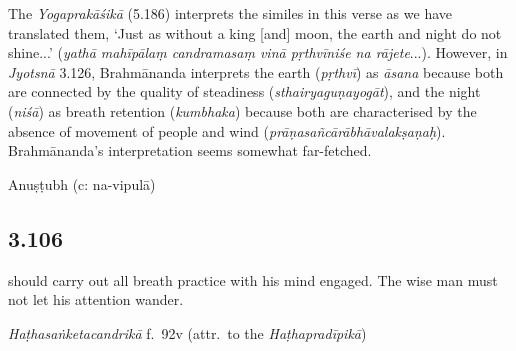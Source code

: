 \begin{ekdosis}
\begin{testimonia}[hp03_105]
\end{testimonia}

\begin{philcomm}[hp03_105]
The \emph{Yogaprakāśikā} (5.186) interprets the similes in this verse as we have translated them, `Just as without a king [and] moon, the earth and night do not shine...' (\emph{yathā mahīpālaṃ candramasaṃ vinā pṛthvīniśe na rājete}...). However, in \emph{Jyotsnā} 3.126, Brahmānanda interprets the earth (\emph{pṛthvī}) as \emph{āsana} because both are connected by the quality of steadiness (\emph{sthairyaguṇayogāt}), and the night (\emph{niśā}) as breath retention (\emph{kumbhaka}) because both are characterised by the absence of movement of people and wind (\emph{prāṇasañcārābhāvalakṣaṇaḥ}). Brahmānanda's interpretation seems somewhat far-fetched. 
\end{philcomm}

\begin{metre}[hp03_105]
Anuṣṭubh (c: na-vipulā)
\end{metre}

\subsection*{3.106}
\begin{translation} should carry out all breath practice with his mind engaged. The wise man must not let his attention wander.
\end{translation}


\begin{testimonia}[hp03_106]
\emph{Haṭhasaṅketacandrikā} f.~92v (attr.~to the \emph{Haṭhapradīpikā})
\begin{versinnote}
\end{versinnote}
\end{testimonia}


\end{ekdosis}
